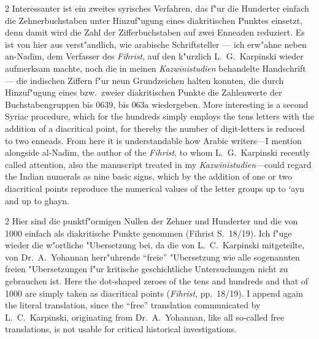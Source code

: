 \documentclass[10pt,a4paper]{article}
\renewcommand{\switchcolumn}{\syncronize\nointerlineskip\columnbreak}
\newcommand{\enquote}[1]{``#1''}
\begin{document}
\begin{paracol}{2}
Interessanter ist ein zweites syrisches Verfahren, das f"ur die Hunderter einfach die Zehnerbuchstaben unter Hinzuf"ugung eines diakritischen Punktes einsetzt, denn damit wird die Zahl der Zifferbuchstaben auf zwei Enneaden reduziert. Es ist von hier aus verst"andlich, wie arabische Schriftsteller --- ich erw"ahne neben an-Nad\={i}m, dem Verfasser des \textit{Fihrist}, auf den k"urzlich L.\ G.\ Karpinski wieder aufmerksam machte, noch die in meinen \textit{Kazw\={i}nistudien} behandelte Handschrift --- die indischen Ziffern f"ur neun Grundzeichen halten konnten, die durch Hinzuf"ugung eines bzw.\ zweier diakritischen Punkte die Zahlenwerte der Buchstabengruppen bis $\text{\u0639}$, bis $\text{\u063a}$ wiedergeben.
\switchcolumn
More interesting is a second Syriac procedure, which for the hundreds simply employs the tens letters with the addition of a diacritical point, for thereby the number of digit-letters is reduced to two enneads. From here it is understandable how Arabic writers---I mention alongside al-Nad\={i}m, the author of the \textit{Fihrist}, to whom L.\ G.\ Karpinski recently called attention, also the manuscript treated in my \textit{Kazw\={i}nistudien}---could regard the Indian numerals as nine basic signs, which by the addition of one or two diacritical points reproduce the numerical values of the letter groups up to `ayn and up to ghayn.
\end{paracol}

\begin{paracol}{2}
Hier sind die punktf"ormigen Nullen der Zehner und Hunderter und die von 1000 einfach als diakritische Punkte genommen (Fihrist S.\ 18/19). Ich f"uge wieder die w"ortliche "Ubersetzung bei, da die von L.\ C.\ Karpinski mitgeteilte, von Dr.\ A.\ Yohannan herr"uhrende \enquote{freie} "Ubersetzung wie alle sogenannten freien "Ubersetzungen f"ur kritische geschichtliche Untersuchungen nicht zu gebrauchen ist.
\switchcolumn
Here the dot-shaped zeroes of the tens and hundreds and that of 1000 are simply taken as diacritical points (\textit{Fihrist}, pp.\ 18/19). I append again the literal translation, since the ``free'' translation communicated by L.\ C.\ Karpinski, originating from Dr.\ A.\ Yohannan, like all so-called free translations, is not usable for critical historical investigations.
\end{paracol}
\end{document}
